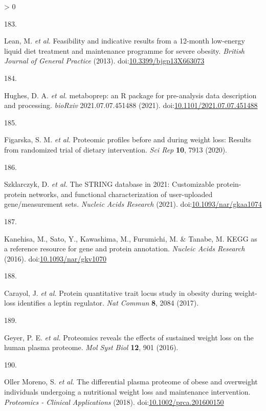 \documentclass[11pt,twoside]{bristolthesis}
\newlength{\cslhangindent}
\newlength{\csllabelwidth}
\newenvironment{CSLReferences}[2] %
 {%
  \setlength{\parindent}{0pt}
  \ifodd #1 \everypar{\setlength{\hangindent}{\cslhangindent}}\ignorespaces\fi
  \ifnum #2 > 0
  \setlength{\parskip}{#2\baselineskip}
  \fi
 }%
 {}
\newcommand{\CSLLeftMargin}[1]{\parbox[t]{\csllabelwidth}{#1}}
\newcommand{\CSLRightInline}[1]{\parbox[t]{\linewidth - \csllabelwidth}{#1}\break}
\begin{document}
\begin{CSLReferences}{0}{0}
\leavevmode\hypertarget{ref-Lean2013}{}%
\CSLLeftMargin{183. }
\CSLRightInline{Lean, M. \emph{et al.} {Feasibility and indicative results from a 12-month low-energy liquid diet treatment and maintenance programme for severe obesity}. \emph{British Journal of General Practice} (2013). doi:\href{https://doi.org/10.3399/bjgp13X663073}{10.3399/bjgp13X663073}}

\leavevmode\hypertarget{ref-Hughes2021}{}%
\CSLLeftMargin{184. }
\CSLRightInline{Hughes, D. A. \emph{et al.} {metaboprep: an R package for pre-analysis data description and processing}. \emph{bioRxiv} 2021.07.07.451488 (2021). doi:\href{https://doi.org/10.1101/2021.07.07.451488}{10.1101/2021.07.07.451488}}

\leavevmode\hypertarget{ref-Figarska2020}{}%
\CSLLeftMargin{185. }
\CSLRightInline{Figarska, S. M. \emph{et al.} {Proteomic profiles before and during weight loss: Results from randomized trial of dietary intervention}. \emph{Sci Rep} \textbf{10}, 7913 (2020).}

\leavevmode\hypertarget{ref-Szklarczyk2021}{}%
\CSLLeftMargin{186. }
\CSLRightInline{Szklarczyk, D. \emph{et al.} {The STRING database in 2021: Customizable protein-protein networks, and functional characterization of user-uploaded gene/measurement sets}. \emph{Nucleic Acids Research} (2021). doi:\href{https://doi.org/10.1093/nar/gkaa1074}{10.1093/nar/gkaa1074}}

\leavevmode\hypertarget{ref-Kanehisa2016}{}%
\CSLLeftMargin{187. }
\CSLRightInline{Kanehisa, M., Sato, Y., Kawashima, M., Furumichi, M. \& Tanabe, M. {KEGG as a reference resource for gene and protein annotation}. \emph{Nucleic Acids Research} (2016). doi:\href{https://doi.org/10.1093/nar/gkv1070}{10.1093/nar/gkv1070}}

\leavevmode\hypertarget{ref-Carayol2017}{}%
\CSLLeftMargin{188. }
\CSLRightInline{Carayol, J. \emph{et al.} {Protein quantitative trait locus study in obesity during weight-loss identifies a leptin regulator}. \emph{Nat Commun} \textbf{8}, 2084 (2017).}

\leavevmode\hypertarget{ref-Geyer2016}{}%
\CSLLeftMargin{189. }
\CSLRightInline{Geyer, P. E. \emph{et al.} {Proteomics reveals the effects of sustained weight loss on the human plasma proteome}. \emph{Mol Syst Biol} \textbf{12}, 901 (2016).}

\leavevmode\hypertarget{ref-OllerMoreno2018}{}%
\CSLLeftMargin{190. }
\CSLRightInline{Oller Moreno, S. \emph{et al.} {The differential plasma proteome of obese and overweight individuals undergoing a nutritional weight loss and maintenance intervention}. \emph{Proteomics - Clinical Applications} (2018). doi:\href{https://doi.org/10.1002/prca.201600150}{10.1002/prca.201600150}}


\end{CSLReferences}
\end{document}

